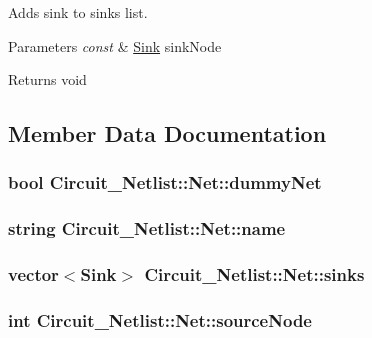 Adds sink to sinks list. 


\begin{DoxyParams}{Parameters}
{\em const} & \hyperlink{structCircuit__Netlist_1_1Sink}{Sink} sink\-Node\\
\hline
\end{DoxyParams}
\begin{DoxyReturn}{Returns}
void 
\end{DoxyReturn}


\subsection{Member Data Documentation}
\hypertarget{structCircuit__Netlist_1_1Net_aad21a10a91330fd07d89ffccf21b55f8}{
\subsubsection[{dummy\-Net}]{\setlength{\rightskip}{0pt plus 5cm}bool Circuit\-\_\-\-Netlist\-::\-Net\-::dummy\-Net}}\label{structCircuit__Netlist_1_1Net_aad21a10a91330fd07d89ffccf21b55f8}
\hypertarget{structCircuit__Netlist_1_1Net_aaf85019638c09259b055dc0d1352054a}{
\subsubsection[{name}]{\setlength{\rightskip}{0pt plus 5cm}string Circuit\-\_\-\-Netlist\-::\-Net\-::name}}\label{structCircuit__Netlist_1_1Net_aaf85019638c09259b055dc0d1352054a}
\hypertarget{structCircuit__Netlist_1_1Net_a99d49ffd915347f780cae8fa9cbbd841}{
\subsubsection[{sinks}]{\setlength{\rightskip}{0pt plus 5cm}vector$<${\bf Sink}$>$ Circuit\-\_\-\-Netlist\-::\-Net\-::sinks}}\label{structCircuit__Netlist_1_1Net_a99d49ffd915347f780cae8fa9cbbd841}
\hypertarget{structCircuit__Netlist_1_1Net_a92ee3950fbcbe247f1d98c180ebb4813}{
\subsubsection[{source\-Node}]{\setlength{\rightskip}{0pt plus 5cm}int Circuit\-\_\-\-Netlist\-::\-Net\-::source\-Node}}\label{structCircuit__Netlist_1_1Net_a92ee3950fbcbe247f1d98c180ebb4813}
